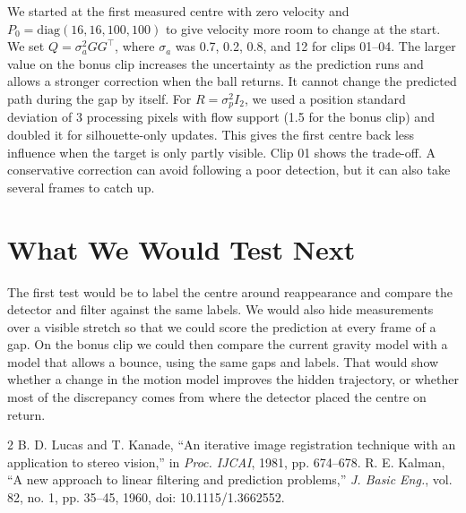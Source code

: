 \documentclass[conference]{assets/latex/IEEEtran}
\begin{document}
\newpage
We started at the first measured centre with zero velocity and
$P_0=\mathrm{diag}(16,16,100,100)$ to give velocity more room to
change at the start. We set $Q=\sigma_a^2 GG^\top$, where $\sigma_a$
was 0.7, 0.2, 0.8, and 12 for clips 01--04. The larger value on the
bonus clip increases the uncertainty as the prediction runs and
allows a stronger correction when the ball returns. It cannot change
the predicted path during the gap by itself. For
$R=\sigma_p^2 I_2$, we used a position standard deviation of 3
processing pixels with flow support (1.5 for the bonus clip) and
doubled it for silhouette-only updates. This gives the first centre
back less influence when the target is only partly visible. Clip 01
shows the trade-off. A conservative correction can avoid following a
poor detection, but it can also take several frames to catch up.

\section{What We Would Test Next}

The first test would be to label the centre around reappearance and
compare the detector and filter against the same labels. We would
also hide measurements over a visible stretch so that we could score
the prediction at every frame of a gap. On the bonus clip we could
then compare the current gravity model with a model that allows a
bounce, using the same gaps and labels. That would show whether a
change in the motion model improves the hidden trajectory, or
whether most of the discrepancy comes from where the detector placed
the centre on return.

\begin{thebibliography}{2}
B. D. Lucas and T. Kanade, \textquotedblleft An iterative image registration
technique with an application to stereo vision,\textquotedblright{} in
\emph{Proc. IJCAI}, 1981, pp. 674--678.
R. E. Kalman, \textquotedblleft A new approach to linear filtering and
prediction problems,\textquotedblright{} \emph{J. Basic Eng.}, vol. 82,
no. 1, pp. 35--45, 1960, doi: 10.1115/1.3662552.
\end{thebibliography}
\end{document}
